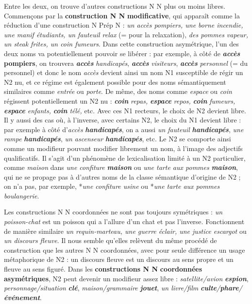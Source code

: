 {    Entre les deux, on trouve d’autres constructions N N plus ou moins libres. Commençons par la \textbf{construction N N} \textbf{modificative}, qui apparaît comme la réduction d’une construction N Prép N : \textit{un accès pompiers, une borne incendie, une manif étudiants, un fauteuil relax} (= pour la relaxation), \textit{des pommes vapeur, un steak frites, un coin fumeurs}. Dans cette construction asymétrique, l’un des deux noms va potentiellement pouvoir se libérer : par exemple, à côté de \textbf{\textit{accès}  pompiers}, on trouvera \textbf{\textit{accès}} \textit{handicapés}, \textbf{\textit{accès}} \textit{visiteurs}, \textbf{\textit{accès}} \textit{personnel} (= du personnel) et donc le nom \textit{accès} devient ainsi un nom N1 susceptible de régir un N2 nu, et ce régime est également possible pour des noms sémantiquement similaires comme \textit{entrée} ou \textit{porte}. De même, des noms comme \textit{espace} ou \textit{coin} régissent potentiellement un N2 nu : \textbf{\textit{coin}} \textit{repas,} \textbf{\textit{espace}} \textit{repos,} \textbf{\textit{coin}} \textit{fumeurs,} \textbf{\textit{espace}} \textit{enfants,} \textbf{\textit{coin}} \textit{télé,} etc. Avec ces N1 recteurs, le choix de N2 devient libre. 
    Il y aussi des cas où, à l'inverse, avec certains N2, le choix du N1 devient libre : par exemple à côté d’\textit{accès} \textbf{\textit{handicapés}}, on a aussi \textit{un fauteuil} \textbf{\textit{handicapés}}, \textit{une rampe} \textbf{\textit{handicapés}}, \textit{un ascenseur} \textbf{\textit{handicapés}}, etc. Le N2 se comporte ainsi comme un modifieur pouvant modifier librement un nom, à l'image des adjectifs qualificatifs. Il s'agit d'un phénomène de lexicalisation limité à un N2 particulier, comme \textit{maison} dans \textit{une confiture} \textbf{\textit{maison}} ou \textit{une tarte aux pommes} \textbf{\textit{maison}}, qui ne se propage pas à d'autres noms de la classe sémantique d'origine de N2 ; on n’a pas, par exemple, *\textit{une confiture usine} ou *\textit{une tarte aux pommes boulangerie}.

    Les constructions N N coordonnées ne sont pas toujours symétriques : \textit{un poisson-chat} est un poisson qui a l’allure d’un chat et pas l’inverse. Fonctionnent de manière similaire \textit{un requin-marteau, une guerre éclair, une justice escargot} ou \textit{un discours fleuve}. Il nous semble qu’elles relèvent du même procédé de construction que les autres N N coordonnées, avec pour seule différence un usage métaphorique de N2 : un discours fleuve est un discours au sens propre et un fleuve au sens figuré. Dans les \textbf{constructions N N} \textbf{coordonnées asymétriques}, N2 peut devenir un modifieur assez libre : \textit{satellite/avion} \textbf{\textit{espion}}, \textit{personnage/situation} \textbf{\textit{clé}}, \textit{maison/grammaire} \textbf{\textit{jouet}}, \textit{un livre/film} \textbf{\textit{culte}}\textit{/}\textbf{\textit{phare}}\textit{/}\textbf{\textit{événement}}.

}
